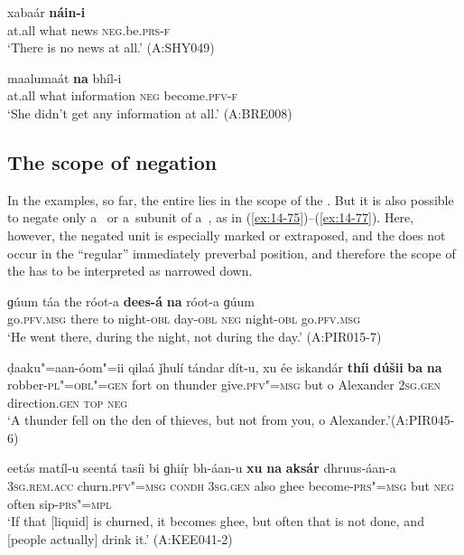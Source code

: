\begin{exe}
\ex
\label{ex:14-73}
\gll [hiǰ ɡa] xabaár \textbf{náin-i} \\
at.all what news \textsc{neg}.be.\textsc{prs-f}  \\
\glt `There is no news at all.' (A:SHY049)

\ex
\label{ex:14-74}
\gll [hiǰ ɡa] maalumaát \textbf{na} bhíl-i \\
at.all what information \textsc{neg} become.\textsc{pfv-f } \\
\glt `She didn't get any information at all.' (A:BRE008)
\end{exe}

\subsection{The scope of negation}
\label{subsec:14-3-3}


 In the examples, so far, the entire  lies in the scope of the . But it is also possible to negate only a~ or a~subunit of a~, as in (\ref{ex:14-75})--(\ref{ex:14-77}). Here, however, the negated unit is especially marked or extraposed, and the  does not occur in the ``regular'' immediately preverbal position, and therefore the scope of the  has to be interpreted as narrowed down. 

\begin{exe}
\ex
\label{ex:14-75}
\gll ɡúum táa the róot-a \textbf{dees-á} \textbf{na} róot-a  ɡúum \\
go.\textsc{pfv.msg} there to night-\textsc{obl} day-\textsc{obl} \textsc{neg} night-\textsc{obl}  go.\textsc{pfv.msg}  \\
\glt `He went there, during the night, not during the day.' (A:PIR015-7)

\ex
\label{ex:14-76}
\gll ḍaaku"=aan-óom"=ii qilaá ǰhulí tándar dít-u, xu ée iskandár \textbf{thíi} \textbf{dúšii} \textbf{ba} \textbf{na} \\
robber-\textsc{pl"=obl"=gen} fort on thunder give.\textsc{pfv"=msg} but o Alexander \textsc{2sg.gen} direction.\textsc{gen} \textsc{top} \textsc{neg} \\
\glt `A thunder fell on the den of thieves, but not from you, o Alexander.'\newline (A:PIR045-6)

\ex
\label{ex:14-77}
\gll eetás matíl-u seentá tasíi bi ɡhiíṛ  bh-áan-u \textbf{xu} \textbf{na} \textbf{aksár} dhruus-áan-a\\
\textsc{3sg.rem.acc} churn.\textsc{pfv"=msg} \textsc{condh} \textsc{3sg.gen} also ghee  become-\textsc{prs"=msg} but \textsc{neg} often sip-\textsc{prs"=mpl}  \\
\glt `If that [liquid] is churned, it becomes ghee, but often that is not done, and [people actually] drink it.' (A:KEE041-2)
\end{exe}

